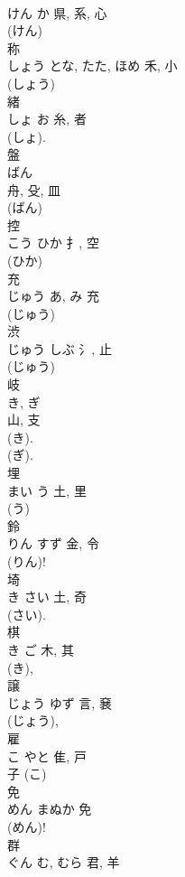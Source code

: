 \documentclass[8pt]{extreport}
\begin{document}
\begin{CJK}{UTF8}{min}
\\	けん	か	県, 系, 心	
\\	(けん) 
\\	称	
\\	しょう	とな, たた, ほめ	禾, 小		
\\	(しょう) 
\\	緒	
\\	しょ	お	糸, 者	
\\	(しょ). 
\\	盤	
\\	ばん	
\\	舟, 殳, 皿	
\\	(ばん) 
\\	控	
\\	こう	ひか	扌, 空	
\\	(ひか) 
\\	充	
\\	じゅう	あ, み	充	
\\	(じゅう) 
\\	渋	
\\	じゅう	しぶ	氵, 止		
\\	(じゅう) 
\\	岐	
\\	き, ぎ	
\\	山, 支	
\\	(き). 
\\	(ぎ).	
\\	埋	
\\	まい	う	土, 里	
\\	(う) 
\\	鈴	
\\	りん	すず	金, 令	
\\	(りん)! 
\\	埼	
\\	き	さい	土, 奇	
\\	(さい). 
\\	棋	
\\	き	ご	木, 其	
\\	(き), 
\\	譲	
\\	じょう	ゆず	言, 㐮	
\\	(じょう), 
\\	雇	
\\	こ	やと	隹, 戸	
\\	子 (こ) 
\\	免	
\\	めん	まぬか	免	
\\	(めん)! 
\\	群	
\\	ぐん	む, むら	君, 羊	

\end{CJK}
\end{document}
